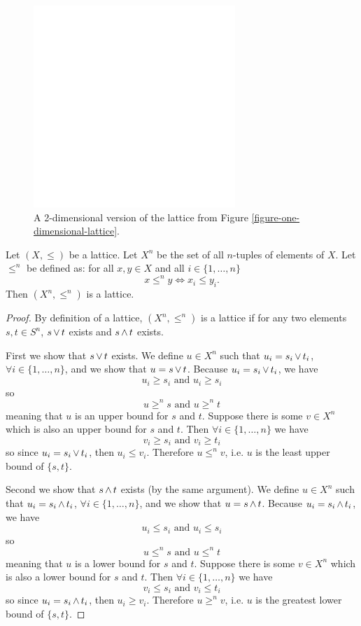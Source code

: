 	\begin{figure}[ht]
		\begin{center}
			\includegraphics[width=3in]{../figures/diagram6.pdf}
			\caption{A 2-dimensional version of the lattice from Figure \ref{figure-one-dimensional-lattice}.}
			\label{figure-two-dimensional-lattice}
		\end{center}
	\end{figure}

	\begin{proposition}
		\label{proposition-grid-is-lattice}
		Let $(X, \le)$ be a lattice. Let $X^n$ be the set of all $n$-tuples of elements of $X$. Let $\le^n$ be defined as: for all $x, y \in X$ and all $i \in \{1, \ldots, n\}$
		\[
			x \le^n y \iff x_i \le y_i.
		\]
		Then $(X^n, \le^n)$ is a lattice.
	\end{proposition}

	\begin{proof}
		By definition of a lattice, $(X^n, \le^n)$ is a lattice if for any two elements $s, t \in S^n$, $s \operatorname{\vee} t$ exists and $s \operatorname{\wedge} t$ exists.

		First we show that $s \operatorname{\vee} t$ exists. We define $u \in X^n$ such that $u_i = s_i \operatorname{\vee} t_i$, $\forall i \in \{1, \ldots, n\}$, and we show that $u = s \operatorname{\vee} t$. Because $u_i = s_i \operatorname{\vee} t_i$, we have
		\[
			u_i \ge s_i \textrm{ and } u_i \ge s_i
		\]
		so
		\[
			u \ge^n s \textrm{ and } u \ge^n t
		\]
		meaning that $u$ is an upper bound for $s$ and $t$. Suppose there is some $v \in X^n$ which is also an upper bound for $s$ and $t$. Then $\forall i \in \{1, \ldots, n\}$ we have
		\[
			v_i \ge s_i \textrm{ and } v_i \ge t_i
		\]
		so since $u_i = s_i \operatorname{\vee} t_i$, then $u_i \le v_i$. Therefore $u \le^n v$, i.e. $u$ is the least upper bound of $\{s, t\}$.

		Second we show that $s \operatorname{\wedge} t$ exists (by the same argument). We define $u \in X^n$ such that $u_i = s_i \operatorname{\wedge} t_i$, $\forall i \in \{1, \ldots, n\}$, and we show that $u = s \operatorname{\wedge} t$. Because $u_i = s_i \operatorname{\wedge} t_i$, we have
		\[
			u_i \le s_i \textrm{ and } u_i \le s_i
		\]
		so
		\[
			u \le^n s \textrm{ and } u \le^n t
		\]
		meaning that $u$ is a lower bound for $s$ and $t$. Suppose there is some $v \in X^n$ which is also a lower bound for $s$ and $t$. Then $\forall i \in \{1, \ldots, n\}$ we have
		\[
			v_i \le s_i \textrm{ and } v_i \le t_i
		\]
		so since $u_i = s_i \operatorname{\wedge} t_i$, then $u_i \ge v_i$. Therefore $u \ge^n v$, i.e. $u$ is the greatest lower bound of $\{s, t\}$.
	\end{proof}


